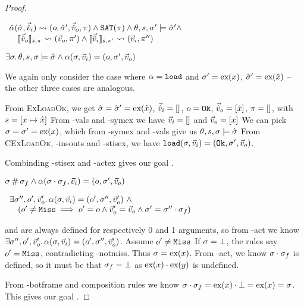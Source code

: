 \begin{proof}
\pfassume \begin{hypvlist}
 $
\begin{array}{l}
\ppexec{\hat\alpha}{\sst,\sins}{o,\sst',\souts, \pc} \land \SAT(\pc) \land \theta,s,\st'\models\sst' \land \\
\quad \expeval[\hat s,\pc]{\souts}\rightsquigarrow(\outs,\pc')\land \expeval[\hat s,\pc']{\sins}\rightsquigarrow(\ins,\pc'')
\end{array}
$
\end{hypvlist}
\pfprove \begin{goalvlist}
 $\exists \st\ldotp \theta,s,\st\models\sst \land \ppexecc{\alpha}{\st,\ins}{o,\st',\outs}$
\end{goalvlist}

We again only consider the case where $\alpha=\load$ and $\st'=\ex{x}$, $\sst'=\ex{\sym x}$ -- the other three cases are analogous.
\begin{hypvlist}
 From \textsc{ExLoadOk}, we get $\sst=\sst'=\ex{\sym x}$, $\sins=[]$, $o=\Ok$, $\souts=[\sym x]$, $\pc=[]$, with $s=[x\mapsto \sym x]$
 From \hyp{vals} and \hyp{symex} we have $\ins=[]$ and $\outs=[x]$
 We can pick $\st=\st'=\ex{x}$, which from \hyp{symex} and \hyp{vals} give us $\theta,s,\st\models\sst$
 From \textsc{CExLoadOk}, \hyp{insouts} and \hyp{stisex}, we have $\ppexecc{\load}{\st,\ins}{\Ok,\st',\outs}$.
\end{hypvlist}
Combinding \hyp{stisex} and \hyp{actex} gives our goal .


\pfassume \begin{hypvlist}
 $\st\disj\st_f \land \ppexecc{\alpha}{\st\cdot\st_f,\ins}{o,\st',\outs}$
\end{hypvlist}
\pfprove \begin{goalvlist}
 $\begin{array}{l}
\exists \st'', o', \outs'\ldotp \ppexecc{\alpha}{\st,\ins}{o', \st'', \outs'} ~\land \\
\quad(o' \neq \Miss \implies o' = o \land  \outs' = \outs \land \st' = \st'' \cdot \st_f)
\end{array}$
\end{goalvlist}
\begin{hypvlist}
	 \load{} and \store{} are always defined for respectively 0 and 1 arguments, so from \hyp{act} we know $\exists \st'', o', \outs'\ldotp \ppexecc{\alpha}{\st,\ins}{o', \st'', \outs'}$.
	 Assume $o'\neq\Miss$
	 If $\st=\bot$, the rules say $o'=\Miss$, contradicting \hyp{notmiss}. Thus $\st=\ex{x}$.
	 From \hyp{act}, we know $\st\cdot\st_f$ is defined, so it must be that $\st_f=\bot$ as $\ex{x}\cdot\ex{y}$ is undefined.
\end{hypvlist}
From \hyp{botframe} and composition rules we know $\st\cdot\st_f=\ex{x}\cdot\bot=\ex{x}=\st$. This gives our goal .


\end{proof}
